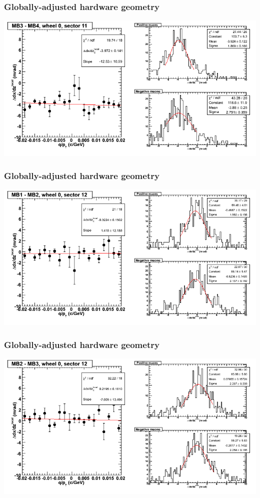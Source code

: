 \documentclass[compress]{beamer}
\begin{document}
\begin{frame}
\frametitle{Globally-adjusted hardware geometry}
\includegraphics[width=\linewidth]{NOV4_segdiffs_HW/dt13_slope_C_11_34.png}
\end{frame}

\begin{frame}
\frametitle{Globally-adjusted hardware geometry}
\includegraphics[width=\linewidth]{NOV4_segdiffs_HW/dt13_slope_C_12_12.png}
\end{frame}

\begin{frame}
\frametitle{Globally-adjusted hardware geometry}
\includegraphics[width=\linewidth]{NOV4_segdiffs_HW/dt13_slope_C_12_23.png}
\end{frame}
\end{document}
